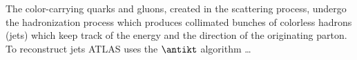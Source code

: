 The color-carrying quarks and gluons, created in the scattering process, undergo
the hadronization process which produces collimated bunches of colorless hadrons
(jets) which keep track of the energy and the direction of the originating
parton. To reconstruct jets ATLAS uses the \emph{$\antikt$} algorithm \dots
